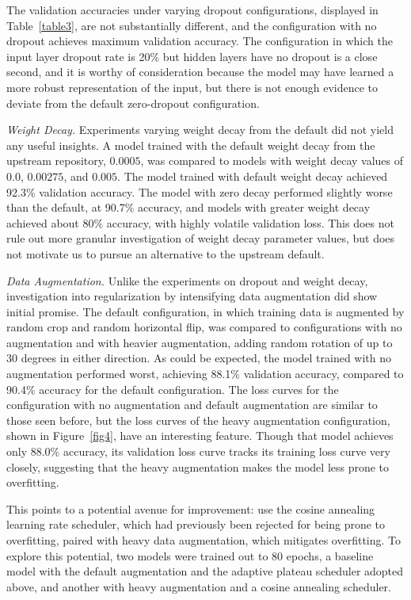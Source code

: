 \documentclass[letterpaper]{article} %
\begin{document}
The validation accuracies under varying dropout configurations, displayed in Table~\ref{table3},
are not substantially different, and the configuration with no dropout achieves maximum validation accuracy.
The configuration in which the input layer dropout rate is 20\% but hidden layers have no dropout
is a close second, and it is worthy of consideration because the model may have learned a more robust
representation of the input, but there is not enough evidence to deviate from the default zero-dropout
configuration.

\textit{Weight Decay.}
Experiments varying weight decay from the default did not yield any useful insights.
A model trained with the default weight decay from the upstream repository, $0.0005 $,
was compared to models with weight decay values of $ 0.0 $, $ 0.00275 $, and $ 0.005 $.
The model trained with default weight decay achieved 92.3\% validation accuracy.
The model with zero decay performed slightly worse than the default, at 90.7\% accuracy, and
models with greater weight decay achieved about 80\% accuracy, with highly volatile validation
loss.
This does not rule out more granular investigation of weight decay parameter values, but does not
motivate us to pursue an alternative to the upstream default.

\textit{Data Augmentation.}
Unlike the experiments on dropout and weight decay, investigation into regularization by
intensifying data augmentation did show initial promise.
The default configuration, in which training data is augmented by random crop and random horizontal flip,
was compared to configurations with no augmentation and with heavier augmentation,
adding random rotation of up to 30 degrees in either direction.
As could be expected, the model trained with no augmentation performed worst,
achieving 88.1\% validation accuracy, compared to 90.4\% accuracy for the default configuration.
The loss curves for the configuration with no augmentation and default augmentation
are similar to those seen before, but the loss curves of the heavy augmentation
configuration, shown in Figure~\ref{fig4}, have an interesting feature.
Though that model achieves only 88.0\% accuracy, its
validation loss curve tracks its training loss curve very closely, suggesting that
the heavy augmentation makes the model less prone to overfitting.

This points to a potential avenue for improvement: use the cosine annealing learning rate scheduler,
which had previously been rejected for being prone to overfitting, paired with heavy
data augmentation, which mitigates overfitting.
To explore this potential, two models were trained out to 80 epochs, a baseline model with the
default augmentation and the adaptive plateau scheduler adopted above, and another with
heavy augmentation and a cosine annealing scheduler.
\end{document}
